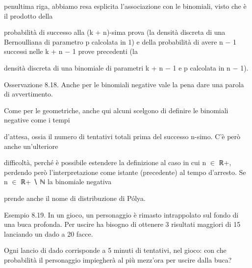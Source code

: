 \documentclass[a4paper,portrait,12pt]{article}
\begin{document}
\begin{flushleft}
penultima riga, abbiamo resa esplicita l'associazione con le binomiali, visto che \`{e} il prodotto della
\end{flushleft}


\begin{flushleft}
probabilit\`{a} di successo alla (k + n)-sima prova (la densit\`{a} discreta di una Bernoulliana di parametro p calcolata in 1) e della probabilit\`{a} di avere n $-$ 1 successi nelle k + n $-$ 1 prove precedenti (la
\end{flushleft}


\begin{flushleft}
densit\`{a} discreta di una binomiale di parametri k + n $-$ 1 e p calcolata in n $-$ 1).
\end{flushleft}


\begin{flushleft}
Osservazione 8.18. Anche per le binomiali negative vale la pena dare una parola di avvertimento.
\end{flushleft}


\begin{flushleft}
Come per le geometriche, anche qui alcuni scelgono di definire le binomiali negative come i tempi
\end{flushleft}


\begin{flushleft}
d'attesa, ossia il numero di tentativi totali prima del successo n-simo. C'\`{e} per\`{o} anche un'ulteriore
\end{flushleft}


\begin{flushleft}
difficolt\`{a}, perch\'{e} \`{e} possibile estendere la definizione al caso in cui n $\in$ ℝ+, perdendo per\`{o} l'interpretazione come istante (precedente) al tempo d'arresto. Se n $\in$ ℝ+ ∖ ℕ la binomiale negativa
\end{flushleft}


\begin{flushleft}
prende anche il nome di distribuzione di P\'{o}lya.
\end{flushleft}


\begin{flushleft}
Esempio 8.19. In un gioco, un personaggio \`{e} rimasto intrappolato sul fondo di una buca profonda. Per uscire ha bisogno di ottenere 3 risultati maggiori di 15 lanciando un dado a 20 facce.
\end{flushleft}


\begin{flushleft}
Ogni lancio di dado corrisponde a 5 minuti di tentativi, nel gioco: con che probabilit\`{a} il personaggio impiegher\`{a} al più mezz'ora per uscire dalla buca?
\end{flushleft}
\end{document}

